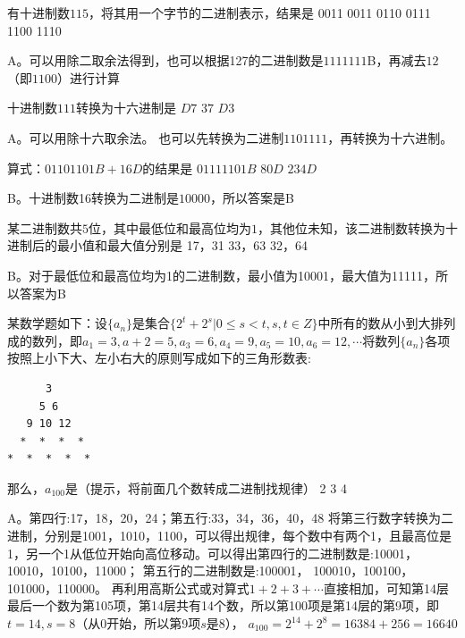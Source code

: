 \begin{groups}
\begin{questions}[rp]
\question
{}有十进制数$115$，将其用一个字节的二进制表示，结果是
{0011 0011}
{0110 0111}
{1100 1110}
\begin{solution}
A。可以用除二取余法得到，也可以根据127的二进制数是$1111111$B，再减去$12$（即$1100$）进行计算
\end{solution}

\question
{}十进制数$111$转换为十六进制是
{$D7$}
{$37$}
{$D3$}
\begin{solution}
A。可以用除十六取余法。
也可以先转换为二进制$1101111$，再转换为十六进制。
\end{solution}

\question
{}算式：$0110 1101B + 16D$的结果是
{$0111 1101B$}
{$80D$}
{$234D$}
\begin{solution}
B。十进制数16转换为二进制是$10000$，所以答案是B
\end{solution}

\question
{}某二进制数共$5$位，其中最低位和最高位均为$1$，其他位未知，该二进制数转换为十进制后的最小值和最大值分别是
{17，31}
{33，63}
{32，64}
\begin{solution}
B。对于最低位和最高位均为1的二进制数，最小值为10001，最大值为11111，所以答案为B
\end{solution}

\question
{}某数学题如下：设$\{a_n\}$是集合$\{2^t+2^s | 0 \le s<t, s,t\in Z\}$中所有的数从小到大排列成的数列，即$a_1=3, a+2=5, a_3=6, a_4=9, a_5=10, a_6=12, \cdots$将数列$\{a_n\}$各项按照上小下大、左小右大的原则写成如下的三角形数表:
\begin{lstlisting}
      3
     5 6
   9 10 12
  *  *  *  *
*  *  *  *  *
\end{lstlisting}
那么，$a_{100}$是（提示，将前面几个数转成二进制找规律）
{2}
{3}
{4}
\begin{solution}
A。第四行:17，18，20，24；第五行:33，34，36，40，48
将第三行数字转换为二进制，分别是1001，1010，1100，可以得出规律，每个数中有两个1，且最高位是1，另一个1从低位开始向高位移动。可以得出第四行的二进制数是:10001， 10010，10100，11000；
第五行的二进制数是:100001， 100010，100100，101000，110000。
再利用高斯公式或对算式$1+2+3+\cdots$直接相加，可知第14层最后一个数为第105项，第14层共有14个数，所以第100项是第14层的第9项，即$t=14,s=8$（从0开始，所以第9项$s$是8）， $a_{100} = 2^{14}+2^8=16384+256= 16640$
\end{solution}


\end{questions}
\end{groups}
